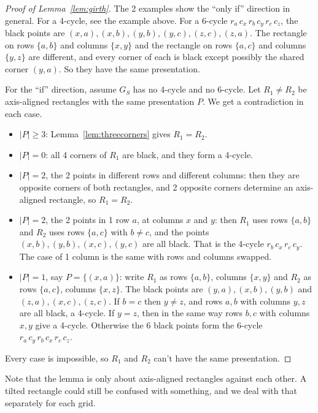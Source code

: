 \documentclass[11pt]{article}
\theoremstyle{definition}
\theoremstyle{remark}
\begin{document}
\begin{proof}[Proof of Lemma~\ref{lem:girth}]
The 2 examples show the ``only if'' direction in general. For a 4-cycle, see the example above.
For a 6-cycle $r_a\,c_x\,r_b\,c_y\,r_c\,c_z$, the black points are $(x,a),(x,b),(y,b),(y,c),
(z,c),(z,a)$. The rectangle on rows $\{a,b\}$ and columns $\{x,y\}$ and the rectangle on rows
$\{a,c\}$ and columns $\{y,z\}$ are different, and every corner of each is black except
possibly the shared corner $(y,a)$. So they have the same presentation.

For the ``if'' direction, assume $G_S$ has no 4-cycle and no 6-cycle. Let $R_1\ne R_2$ be
axis-aligned rectangles with the same presentation $P$. We get a contradiction in each case.
\begin{itemize}[leftmargin=*,itemsep=1pt]
\item $|P|\ge3$: Lemma~\ref{lem:threecorners} gives $R_1=R_2$.
\item $|P|=0$: all 4 corners of $R_1$ are black, and they form a 4-cycle.
\item $|P|=2$, the 2 points in different rows and different columns: then they are opposite
corners of both rectangles, and 2 opposite corners determine an axis-aligned rectangle, so
$R_1=R_2$.
\item $|P|=2$, the 2 points in 1 row $a$, at columns $x$ and $y$: then $R_1$ uses rows
$\{a,b\}$ and $R_2$ uses rows $\{a,c\}$ with $b\ne c$, and the points
$(x,b),(y,b),(x,c),(y,c)$ are all black. That is the 4-cycle $r_b\,c_x\,r_c\,c_y$. The case of
1 column is the same with rows and columns swapped.
\item $|P|=1$, say $P=\{(x,a)\}$: write $R_1$ as rows $\{a,b\}$, columns $\{x,y\}$ and $R_2$ as
rows $\{a,c\}$, columns $\{x,z\}$. The black points are $(y,a),(x,b),(y,b)$ and
$(z,a),(x,c),(z,c)$. If $b=c$ then $y\ne z$, and rows $a,b$ with columns $y,z$ are all black, a
4-cycle. If $y=z$, then in the same way rows $b,c$ with columns $x,y$ give a 4-cycle. Otherwise
the 6 black points form the 6-cycle $r_a\,c_y\,r_b\,c_x\,r_c\,c_z$.
\end{itemize}
Every case is impossible, so $R_1$ and $R_2$ can't have the same presentation.
\end{proof}

Note that the lemma is only about axis-aligned rectangles against each other. A tilted rectangle
could still be confused with something, and we deal with that separately for each grid.

\end{document}
